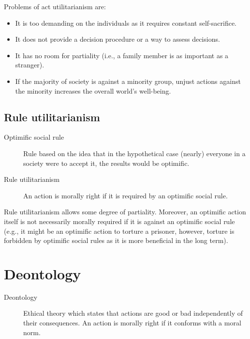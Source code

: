 \begin{remark}
    Problems of act utilitarianism are:
    \begin{itemize}
        \item It is too demanding on the individuals as it requires constant self-sacrifice.
        \item It does not provide a decision procedure or a way to assess decisions.
        \item It has no room for partiality (i.e., a family member is as important as a stranger).
        \item If the majority of society is against a minority group, unjust actions against the minority increases the overall world's well-being.
    \end{itemize}
\end{remark}


\subsection{Rule utilitarianism}

\begin{description}
    \item[Optimific social rule] 
        Rule based on the idea that in the hypothetical case (nearly) everyone in a society were to accept it, the results would be optimific. 

    \item[Rule utilitarianism] 
        An action is morally right if it is required by an optimific social rule.

\end{description}

\begin{remark}
    Rule utilitarianism allows some degree of partiality. Moreover, an optimific action itself is not necessarily morally required if it is against an optimific social rule (e.g., it might be an optimific action to torture a prisoner, however, torture is forbidden by optimific social rules as it is more beneficial in the long term).
\end{remark}



\section{Deontology}

\begin{description}
    \item[Deontology] 
        Ethical theory which states that actions are good or bad independently of their consequences. An action is morally right if it conforms with a moral norm.
\end{description}


